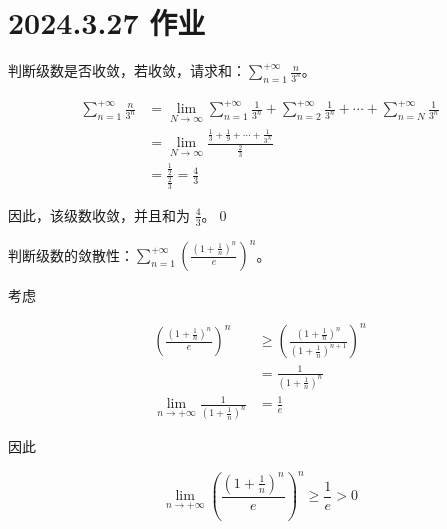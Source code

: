 \ifx\allfiles\undefined

\date{}
\author{尹锦润}

\maketitle
\fi

\section{2024.3.27 作业}
\begin{ques}
判断级数是否收敛，若收敛，请求和：$\displaystyle \sum _{n=1}^{+\infty }\frac{n}{3^{n}}$。
\end{ques}


\begin{align*}
	\sum _{n=1}^{+\infty }\frac{n}{3^{n}} & =\lim _{N\rightarrow \infty }\sum _{n=1}^{+\infty }\frac{1}{3^{n}} +\sum _{n=2}^{+\infty }\frac{1}{3^{n}} +\cdots +\sum _{n=N}^{+\infty }\frac{1}{3^{n}}\\
	& =\lim _{N\rightarrow \infty }\frac{\frac{1}{3} +\frac{1}{9} +\cdots +\frac{1}{3^{N}}}{\frac{2}{3}}\\
	& =\frac{\frac{1}{2}}{\frac{2}{3}} =\frac{4}{3}
\end{align*}


因此，该级数收敛，并且和为 $\displaystyle \frac{4}{3}$。\qed 





\begin{ques}
	判断级数的敛散性：$\displaystyle \sum _{n=1}^{+\infty }\left(\frac{\left( 1+\frac{1}{n}\right)^{n}}{e}\right)^{n}$。
\end{ques}





考虑


\begin{align*}
	\left(\frac{\left( 1+\frac{1}{n}\right)^{n}}{e}\right)^{n} & \geqslant \left(\frac{\left( 1+\frac{1}{n}\right)^{n}}{\left( 1+\frac{1}{n}\right)^{n+1}}\right)^{n}\\
	& =\frac{1}{\left( 1+\frac{1}{n}\right)^{n}}\\
	\lim _{n\rightarrow +\infty }\frac{1}{\left( 1+\frac{1}{n}\right)^{n}} & =\frac{1}{e}
\end{align*}


因此


\begin{equation*}
	\lim _{n\rightarrow +\infty }\left(\frac{\left( 1+\frac{1}{n}\right)^{n}}{e}\right)^{n} \geqslant \frac{1}{e}  >0
\end{equation*}


